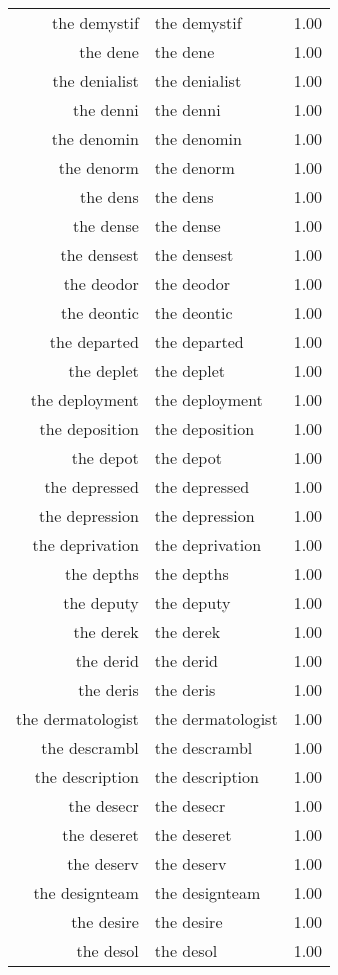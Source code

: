 \begin{table}[ht]
\begin{tabular}{rlr}
  the demystif & the demystif & 1.00 \\ 
  the dene & the dene & 1.00 \\ 
  the denialist & the denialist & 1.00 \\ 
  the denni & the denni & 1.00 \\ 
  the denomin & the denomin & 1.00 \\ 
  the denorm & the denorm & 1.00 \\ 
  the dens & the dens & 1.00 \\ 
  the dense & the dense & 1.00 \\ 
  the densest & the densest & 1.00 \\ 
  the deodor & the deodor & 1.00 \\ 
  the deontic & the deontic & 1.00 \\ 
  the departed & the departed & 1.00 \\ 
  the deplet & the deplet & 1.00 \\ 
  the deployment & the deployment & 1.00 \\ 
  the deposition & the deposition & 1.00 \\ 
  the depot & the depot & 1.00 \\ 
  the depressed & the depressed & 1.00 \\ 
  the depression & the depression & 1.00 \\ 
  the deprivation & the deprivation & 1.00 \\ 
  the depths & the depths & 1.00 \\ 
  the deputy & the deputy & 1.00 \\ 
  the derek & the derek & 1.00 \\ 
  the derid & the derid & 1.00 \\ 
  the deris & the deris & 1.00 \\ 
  the dermatologist & the dermatologist & 1.00 \\ 
  the descrambl & the descrambl & 1.00 \\ 
  the description & the description & 1.00 \\ 
  the desecr & the desecr & 1.00 \\ 
  the deseret & the deseret & 1.00 \\ 
  the deserv & the deserv & 1.00 \\ 
  the designteam & the designteam & 1.00 \\ 
  the desire & the desire & 1.00 \\ 
  the desol & the desol & 1.00 \\ 

\end{tabular}
\end{table}
